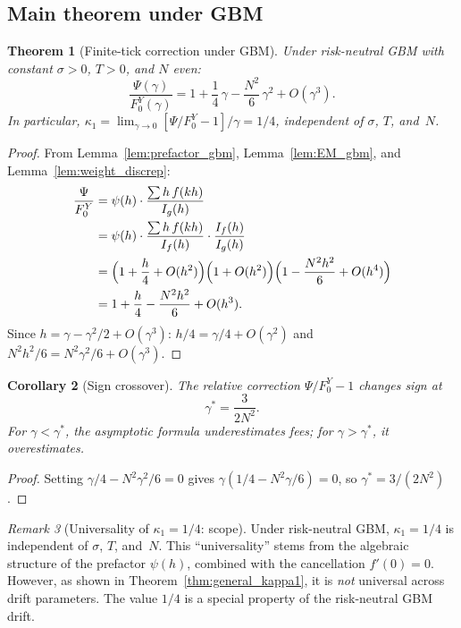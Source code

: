 \documentclass[11pt]{article}
\newtheorem{theorem}{Theorem}[section]
\newtheorem{corollary}[theorem]{Corollary}
\theoremstyle{definition}
\theoremstyle{remark}
\newtheorem{remark}[theorem]{Remark}
\begin{document}
\subsection{Main theorem under GBM}

\begin{theorem}[Finite-tick correction under GBM]
\label{thm:main}
Under risk-neutral GBM with constant $\sigma > 0$, $T > 0$,
and $N$ even:
\begin{equation}\label{eq:main_thm}
\frac{\Psi(\gamma)}{F_0^Y(\gamma)}
= 1 + \frac{1}{4}\,\gamma - \frac{N^2}{6}\,\gamma^2
+ O(\gamma^3).
\end{equation}
In particular,
$\kappa_1 = \lim_{\gamma \to 0}[\Psi/F_0^Y - 1]/\gamma = 1/4$,
independent of $\sigma$, $T$, and~$N$.
\end{theorem}
\begin{proof}
From Lemma~\ref{lem:prefactor_gbm}, Lemma~\ref{lem:EM_gbm}, and
Lemma~\ref{lem:weight_discrep}:
\begin{align*}
\frac{\Psi}{F_0^Y}
&= \psi(h) \cdot \frac{\sum h\,f(kh)}{I_g(h)} \\
&= \psi(h) \cdot
\frac{\sum h\,f(kh)}{I_f(h)} \cdot \frac{I_f(h)}{I_g(h)} \\
&= \Bigl(1 + \frac{h}{4} + O(h^2)\Bigr)
\Bigl(1 + O(h^2)\Bigr)
\Bigl(1 - \frac{N^2 h^2}{6} + O(h^4)\Bigr) \\
&= 1 + \frac{h}{4} - \frac{N^2 h^2}{6} + O(h^3).
\end{align*}
Since $h = \gamma - \gamma^2/2 + O(\gamma^3)$:
$h/4 = \gamma/4 + O(\gamma^2)$ and
$N^2 h^2/6 = N^2\gamma^2/6 + O(\gamma^3)$.
\end{proof}

\begin{corollary}[Sign crossover]\label{cor:crossover}
The relative correction $\Psi/F_0^Y - 1$ changes sign at
\begin{equation}\label{eq:gamma_star}
\gamma^* = \frac{3}{2N^2}.
\end{equation}
For $\gamma < \gamma^*$, the asymptotic formula underestimates
fees; for $\gamma > \gamma^*$, it overestimates.
\end{corollary}
\begin{proof}
Setting $\gamma/4 - N^2\gamma^2/6 = 0$ gives
$\gamma(1/4 - N^2\gamma/6) = 0$, so
$\gamma^* = 3/(2N^2)$.
\end{proof}

\begin{remark}[Universality of $\kappa_1 = 1/4$: scope]
\label{rem:universality}
Under risk-neutral GBM, $\kappa_1 = 1/4$ is independent of $\sigma$,
$T$, and~$N$. This ``universality'' stems from the algebraic
structure of the prefactor $\psi(h)$, combined with the cancellation
$f'(0) = 0$. However, as shown in
Theorem~\ref{thm:general_kappa1}, it is \emph{not} universal across
drift parameters. The value $1/4$ is a special property of the
risk-neutral GBM drift.
\end{remark}
\end{document}

